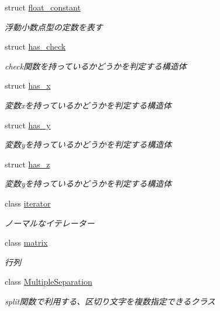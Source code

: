 \begin{DoxyCompactItemize}
\item 
struct \mbox{\hyperlink{structsaki_1_1float__constant}{float\+\_\+constant}}
\begin{DoxyCompactList}\small\item\em 浮動小数点型の定数を表す \end{DoxyCompactList}\item 
struct \mbox{\hyperlink{structsaki_1_1has__check}{has\+\_\+check}}
\begin{DoxyCompactList}\small\item\em check関数を持っているかどうかを判定する構造体 \end{DoxyCompactList}\item 
struct \mbox{\hyperlink{structsaki_1_1has__x}{has\+\_\+x}}
\begin{DoxyCompactList}\small\item\em 変数xを持っているかどうかを判定する構造体 \end{DoxyCompactList}\item 
struct \mbox{\hyperlink{structsaki_1_1has__y}{has\+\_\+y}}
\begin{DoxyCompactList}\small\item\em 変数yを持っているかどうかを判定する構造体 \end{DoxyCompactList}\item 
struct \mbox{\hyperlink{structsaki_1_1has__z}{has\+\_\+z}}
\begin{DoxyCompactList}\small\item\em 変数yを持っているかどうかを判定する構造体 \end{DoxyCompactList}\item 
class \mbox{\hyperlink{classsaki_1_1iterator}{iterator}}
\begin{DoxyCompactList}\small\item\em ノーマルなイテレーター \end{DoxyCompactList}\item 
class \mbox{\hyperlink{classsaki_1_1matrix}{matrix}}
\begin{DoxyCompactList}\small\item\em 行列 \end{DoxyCompactList}\item 
class \mbox{\hyperlink{classsaki_1_1_multiple_separation}{Multiple\+Separation}}
\begin{DoxyCompactList}\small\item\em split関数で利用する、区切り文字を複数指定できるクラス \end{DoxyCompactList}\item 

\end{DoxyCompactItemize}
